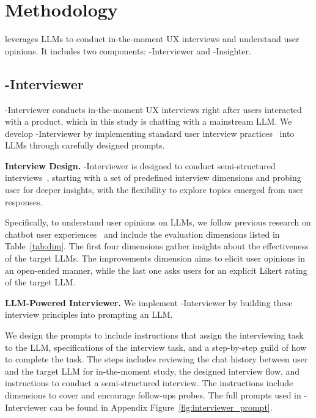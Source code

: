 \section{Methodology}

\method{} leverages LLMs to conduct in-the-moment UX interviews and understand user opinions. It includes two components: \method-Interviewer and \method-Insighter. 

\subsection{\method{}-Interviewer}
\label{sec.interviewer}

\method-Interviewer conducts in-the-moment UX interviews right after users interacted with a product, which in this study is chatting with a mainstream LLM. 
We develop \method-Interviewer by implementing standard user interview practices~\cite{hartson2012ux} into LLMs through carefully designed prompts.

\textbf{Interview Design.} \method-Interviewer is designed to conduct semi-structured interviews~\citep{wilson2013interview}, starting with a set of predefined interview dimensions and probing user for deeper insights, with the flexibility to explore topics emerged from user responses. 

Specifically, to understand user opinions on LLMs, we follow previous research on chatbot user experiences~\citep{casas2020trends} and include the evaluation dimensions listed in Table~\ref{tab:dim}.
The first four dimensions gather insights about the effectiveness of the target LLMs.
The improvements dimension aims to elicit user opinions in an open-ended manner, while the last one asks users for an explicit Likert rating of the target LLM. 

\textbf{LLM-Powered Interviewer.} We implement \method-Interviewer by building these interview principles into prompting an LLM. 

We design the prompts to include instructions that assign the interviewing task to the LLM, specifications of the interview task, and a step-by-step guild of how to complete the task. The steps includes reviewing the chat history between user and the target LLM for in-the-moment study, the designed interview flow, and instructions to conduct a semi-structured interview. The instructions include dimensions to cover and encourage follow-ups probes. The full prompts used in \method-Interviewer can be found in Appendix Figure~\ref{fig:interviewer_prompt}.

